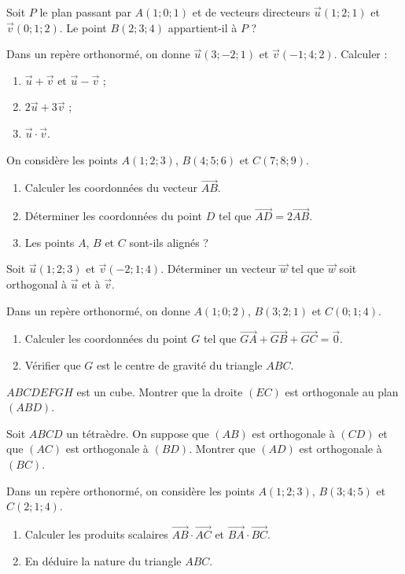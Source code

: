 \exo{}
Soit $P$ le plan passant par $A(1;0;1)$ et de vecteurs directeurs $\vec{u}(1;2;1)$ et $\vec{v}(0;1;2)$. Le point $B(2;3;4)$ appartient-il à $P$ ?


\exo{}
Dans un repère orthonormé, on donne $\vec{u}(3;-2;1)$ et $\vec{v}(-1;4;2)$. Calculer :
\begin{enumerate}[label=\alph*)]
\item $\vec{u}+\vec{v}$ et $\vec{u}-\vec{v}$ ;
\item $2\vec{u}+3\vec{v}$ ;
\item $\vec{u}\cdot\vec{v}$.
\end{enumerate}

\exo{}
On considère les points $A(1;2;3)$, $B(4;5;6)$ et $C(7;8;9)$.
\begin{enumerate}[label=\alph*)]
\item Calculer les coordonnées du vecteur $\overrightarrow{AB}$.
\item Déterminer les coordonnées du point $D$ tel que $\overrightarrow{AD}=2\overrightarrow{AB}$.
\item Les points $A$, $B$ et $C$ sont-ils alignés ?
\end{enumerate}

\exo{}
Soit $\vec{u}(1;2;3)$ et $\vec{v}(-2;1;4)$. Déterminer un vecteur $\vec{w}$ tel que $\vec{w}$ soit orthogonal à $\vec{u}$ et à $\vec{v}$.

\exo{}
Dans un repère orthonormé, on donne $A(1;0;2)$, $B(3;2;1)$ et $C(0;1;4)$.
\begin{enumerate}[label=\alph*)]
\item Calculer les coordonnées du point $G$ tel que $\overrightarrow{GA}+\overrightarrow{GB}+\overrightarrow{GC}=\vec{0}$.
\item Vérifier que $G$ est le centre de gravité du triangle $ABC$.
\end{enumerate}


\exo{}
$ABCDEFGH$ est un cube. Montrer que la droite $(EC)$ est orthogonale au plan $(ABD)$.

\exo{}
Soit $ABCD$ un tétraèdre. On suppose que $(AB)$ est orthogonale à $(CD)$ et que $(AC)$ est orthogonale à $(BD)$. Montrer que $(AD)$ est orthogonale à $(BC)$.

\exo{}
Dans un repère orthonormé, on considère les points $A(1;2;3)$, $B(3;4;5)$ et $C(2;1;4)$.
\begin{enumerate}[label=\alph*)]
\item Calculer les produits scalaires $\overrightarrow{AB}\cdot\overrightarrow{AC}$ et $\overrightarrow{BA}\cdot\overrightarrow{BC}$.
\item En déduire la nature du triangle $ABC$.
\end{enumerate}

